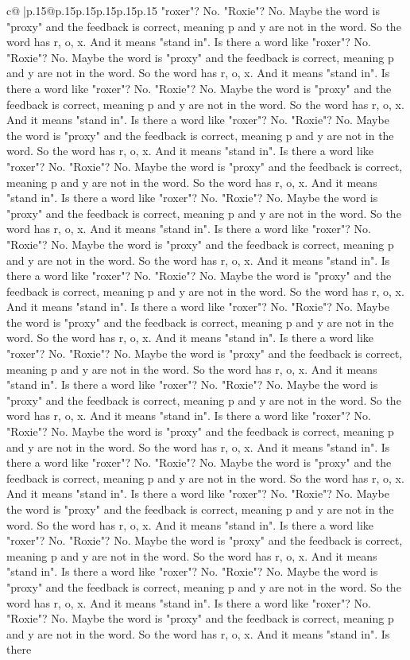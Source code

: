 \documentclass{article}
\begin{document}
{\begin{supertabular}{c@{$\;$}|p{.15\linewidth}@{}p{.15\linewidth}p{.15\linewidth}p{.15\linewidth}p{.15\linewidth}p{.15\linewidth}}
{{{"roxer"? No. "Roxie"? No. Maybe the word is "proxy" and the feedback is correct, meaning p and y are not in the word. So the word has r, o, x. And it means "stand in". Is there a word like "roxer"? No. "Roxie"? No. Maybe the word is "proxy" and the feedback is correct, meaning p and y are not in the word. So the word has r, o, x. And it means "stand in". Is there a word like "roxer"? No. "Roxie"? No. Maybe the word is "proxy" and the feedback is correct, meaning p and y are not in the word. So the word has r, o, x. And it means "stand in". Is there a word like "roxer"? No. "Roxie"? No. Maybe the word is "proxy" and the feedback is correct, meaning p and y are not in the word. So the word has r, o, x. And it means "stand in". Is there a word like "roxer"? No. "Roxie"? No. Maybe the word is "proxy" and the feedback is correct, meaning p and y are not in the word. So the word has r, o, x. And it means "stand in". Is there a word like "roxer"? No. "Roxie"? No. Maybe the word is "proxy" and the feedback is correct, meaning p and y are not in the word. So the word has r, o, x. And it means "stand in". Is there a word like "roxer"? No. "Roxie"? No. Maybe the word is "proxy" and the feedback is correct, meaning p and y are not in the word. So the word has r, o, x. And it means "stand in". Is there a word like "roxer"? No. "Roxie"? No. Maybe the word is "proxy" and the feedback is correct, meaning p and y are not in the word. So the word has r, o, x. And it means "stand in". Is there a word like "roxer"? No. "Roxie"? No. Maybe the word is "proxy" and the feedback is correct, meaning p and y are not in the word. So the word has r, o, x. And it means "stand in". Is there a word like "roxer"? No. "Roxie"? No. Maybe the word is "proxy" and the feedback is correct, meaning p and y are not in the word. So the word has r, o, x. And it means "stand in". Is there a word like "roxer"? No. "Roxie"? No. Maybe the word is "proxy" and the feedback is correct, meaning p and y are not in the word. So the word has r, o, x. And it means "stand in". Is there a word like "roxer"? No. "Roxie"? No. Maybe the word is "proxy" and the feedback is correct, meaning p and y are not in the word. So the word has r, o, x. And it means "stand in". Is there a word like "roxer"? No. "Roxie"? No. Maybe the word is "proxy" and the feedback is correct, meaning p and y are not in the word. So the word has r, o, x. And it means "stand in". Is there a word like "roxer"? No. "Roxie"? No. Maybe the word is "proxy" and the feedback is correct, meaning p and y are not in the word. So the word has r, o, x. And it means "stand in". Is there a word like "roxer"? No. "Roxie"? No. Maybe the word is "proxy" and the feedback is correct, meaning p and y are not in the word. So the word has r, o, x. And it means "stand in". Is there a word like "roxer"? No. "Roxie"? No. Maybe the word is "proxy" and the feedback is correct, meaning p and y are not in the word. So the word has r, o, x. And it means "stand in". Is there a word like "roxer"? No. "Roxie"? No. Maybe the word is "proxy" and the feedback is correct, meaning p and y are not in the word. So the word has r, o, x. And it means "stand in". Is there }}}
\end{supertabular}}
\end{document}
